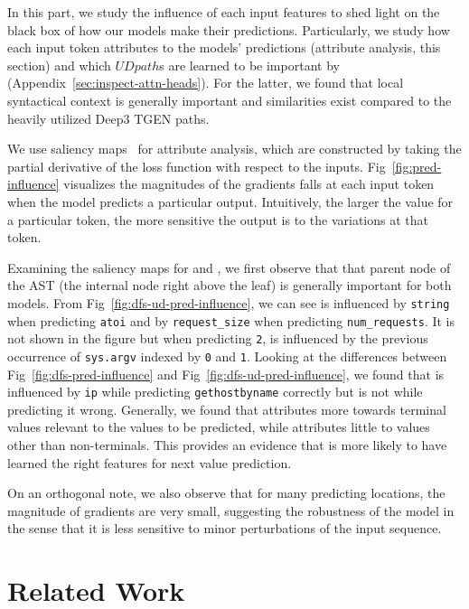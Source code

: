 \documentclass[nonacm, sigconf]{acmart}
\newcommand{\code}[1]{{\texttt{#1}}}
\newcommand{\figref}[1]{Fig~\ref{#1}}
\begin{document}
In this part, we study the influence of each input features to shed light on the black box of how our models make their predictions. 
Particularly, we study how each input token attributes to the models' predictions (attribute analysis, this section) and which $\mathit{UDpath}$s are learned to be important by \TreeRel (Appendix~\ref{sec:inspect-attn-heads}).
For the latter, we found that local syntactical context is generally important and similarities exist compared to the heavily utilized Deep3 TGEN paths.


We use saliency maps~\cite{simonyan2013deep-saliency} for attribute analysis,
which are constructed by taking the partial derivative of the loss function with respect to the inputs.
\figref{fig:pred-influence} visualizes the magnitudes of the gradients falls at each input token when the model predicts a particular output.
Intuitively, the larger the value for a particular token, the more sensitive the output is to the variations at that token. 

Examining the saliency maps for \DFS and \TreeRel, we first observe that that parent node of the AST (the internal node right above the leaf) is generally important for both models.
From \figref{fig:dfs-ud-pred-influence}, we can see \TreeRel is influenced 
by \code{string} when predicting \code{atoi} 
and by \code{request\_size} when predicting \code{num\_requests}.
It is not shown in the figure but when predicting \code{2}, \TreeRel is influenced by the previous occurrence of \code{sys.argv} indexed by \code{0} and \code{1}.
Looking at the differences between \figref{fig:dfs-pred-influence} and \figref{fig:dfs-ud-pred-influence}, we found that \TreeRel is influenced by \code{ip} while predicting \code{gethostbyname} correctly but \DFS is not while predicting it wrong.
Generally, we found that \TreeRel attributes more towards terminal values relevant to the values to be predicted, while \DFS attributes little to values other than non-terminals.
This provides an evidence that \TreeRel is more likely to have learned the right features for next value prediction.

On an orthogonal note, we also observe that for many predicting locations, the magnitude of gradients are very small,
suggesting the robustness of the model in the sense that it is less sensitive to minor perturbations of the input sequence.

 
\section{Related Work}
\label{sec:related-works}
\end{document}
